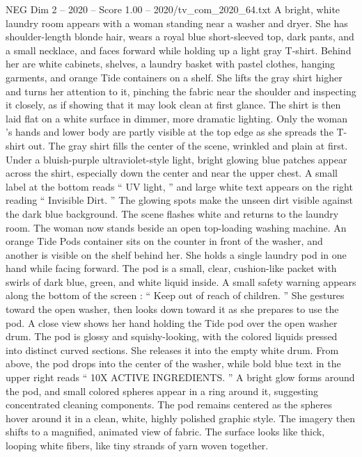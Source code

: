 \begin{textsample}{NEG Dim 2 – 2020 – Score 1.00 – 2020/tv\_com\_2020\_64.txt}  \label{ex:f2_neg_058}
A bright, white laundry room appears with a woman standing near a washer and dryer.
She has shoulder-length blonde hair, wears a royal blue short-sleeved top, dark pants, and a small necklace, and faces forward while holding up a light gray T-shirt.
Behind her are white cabinets, shelves, a laundry basket with pastel clothes, hanging garments, and orange Tide containers on a shelf.
She lifts the gray shirt higher and turns her attention to it, pinching the fabric near the shoulder and inspecting it closely, as if showing that it may look clean at first glance.
The shirt is then laid flat on a white surface in dimmer, more dramatic lighting.
Only the woman ’s hands and lower body are partly visible at the top edge as she spreads the T-shirt out.
The gray shirt fills the center of the scene, wrinkled and plain at first.
Under a bluish-purple ultraviolet-style light, bright glowing blue patches appear across the shirt, especially down the center and near the upper chest.
A small label at the bottom reads “ UV light, ” and large white text appears on the right reading “ Invisible Dirt. ” The glowing spots make the unseen dirt visible against the dark blue background.
The scene flashes white and returns to the laundry room.
The woman now stands beside an open top-loading washing machine.
An orange Tide Pods container sits on the counter in front of the washer, and another is visible on the shelf behind her.
She holds a single laundry pod in one hand while facing forward.
The pod is a small, clear, cushion-like packet with swirls of dark blue, green, and white liquid inside.
A small safety warning appears along the bottom of the screen : “ Keep out of reach of children. ” She gestures toward the open washer, then looks down toward it as she prepares to use the pod.
A close view shows her hand holding the Tide pod over the open washer drum.
The pod is glossy and squishy-looking, with the colored liquids pressed into distinct curved sections.
She releases it into the empty white drum.
From above, the pod drops into the center of the washer, while bold blue text in the upper right reads “ 10X ACTIVE INGREDIENTS. ” A bright glow forms around the pod, and small colored spheres appear in a ring around it, suggesting concentrated cleaning components.
The pod remains centered as the spheres hover around it in a clean, white, highly polished graphic style.
The imagery then shifts to a magnified, animated view of fabric.
The surface looks like thick, looping white fibers, like tiny strands of yarn woven together.

\end{textsample}
